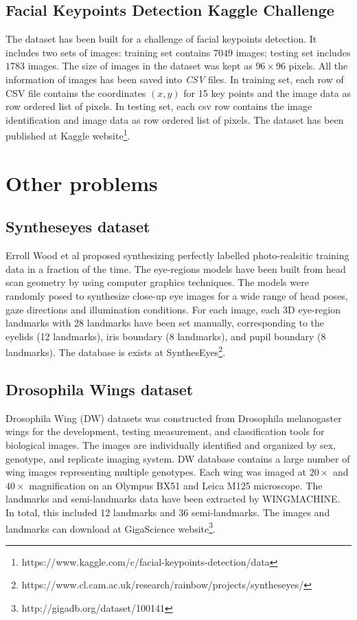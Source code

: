\subsection{Facial Keypoints Detection Kaggle Challenge}
The dataset has been built for a challenge of facial keypoints detection. It includes two sets of images: training set contains $7049$ images; testing set includes $1783$ images. The size of images in the dataset was kept as $96 \times 96$ pixels. All the information of images has been saved into \textit{CSV} files. In training set, each row of CSV file contains the coordinates $(x,y)$ for 15 key points and the image data as row ordered list of pixels. In testing set, each csv row contains the image identification and image data as row ordered list of pixels. The dataset has been published at Kaggle website\footnote{https://www.kaggle.com/c/facial-keypoints-detection/data}.
\section{Other problems}
\subsection{Syntheseyes dataset}
Erroll Wood et al \cite{wood2015_iccv} proposed synthesizing perfectly labelled photo-realsitic training data in a fraction of the time. The eye-regions models have been built from head scan geometry by using computer graphics techniques. The models were randomly posed to synthesize close-up eye images for a wide range of head poses, gaze directions and illumination conditions. For each image, each 3D eye-region landmarks with 28 landmarks have been set manually, corresponding to the eyelids (12 landmarks), iris boundary (8 landmarks), and pupil boundary (8 landmarks).
The database is exists at SynthesEyes\footnote{https://www.cl.cam.ac.uk/research/rainbow/projects/syntheseyes/}.
\subsection{Drosophila Wings dataset}
Drosophila Wing (DW) datasets \cite{sonnenschein2015image} was constructed from Drosophila melanogaster wings for the development, testing measurement, and classification tools for biological images. The images are individually identified and organized by sex, genotype, and replicate imaging system. DW database contains a large number of wing images representing multiple genotypes. Each wing was imaged at $20\times$ and $40\times$ magnification on an Olympus BX51 and Leica M125 microscope. The landmarks and semi-landmarks data have been extracted by WINGMACHINE. In total, this included 12 landmarks and 36 semi-landmarks. The images and landmarks can download at GigaScience website\footnote{http://gigadb.org/dataset/100141}.
